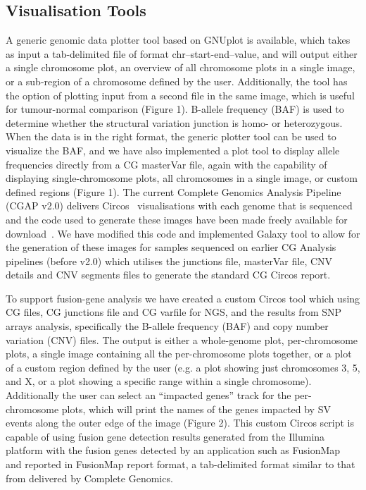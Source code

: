 \documentclass[10pt]{bmc_article}
\newenvironment{bmcformat}{\begin{raggedright}\baselineskip20pt\sloppy\setboolean{publ}{false}}{\end{raggedright}\baselineskip20pt\sloppy}
\begin{document}
\begin{bmcformat}
\subsection*{Visualisation Tools}
A generic genomic data plotter tool based on GNUplot is available, which takes as input a tab-delimited file of format chr–start-end–value, and will output either a single chromosome plot, an overview of all chromosome plots in a single image,  or a sub-region of a chromosome defined by the user. Additionally, the tool has the option of plotting input from a second file in the same image, which is useful for tumour-normal comparison (Figure 1). B-allele frequency (BAF) is used to determine whether the structural variation junction is homo- or heterozygous. When the data is in the right format, the generic plotter tool can be used to visualize the BAF, and we have also implemented a plot tool to display allele frequencies directly from a CG masterVar file, again with the capability of displaying single-chromosome plots, all chromosomes in a single image, or custom defined regions (Figure 1). The current Complete Genomics  Analysis Pipeline (CGAP v2.0) delivers Circos~\cite{url-circos} visualisations with each genome that is sequenced and the code used to generate these images have been made freely available for download~\cite{url-cgcircos}.  We have modified this code and implemented Galaxy tool to allow for the generation of these images for samples sequenced on earlier CG Analysis pipelines (before v2.0) which utilises the junctions file, masterVar file, CNV details and CNV segments files to generate the standard CG Circos report. 

To support fusion-gene analysis we have created a custom Circos tool which using CG files, CG junctions file and CG varfile for NGS, and the results from SNP arrays analysis, specifically the B-allele frequency (BAF) and copy number variation (CNV) files.  The output is either a whole-genome plot, per-chromosome plots, a single image containing all the per-chromosome plots together, or a plot of a custom region defined by the user (e.g. a plot showing just chromosomes 3, 5, and X, or a plot showing a specific range within a single chromosome).  Additionally the user can select an “impacted genes” track for the per-chromosome plots, which will print the names of the genes impacted by SV events along the outer edge of the image (Figure 2).  This custom Circos script is capable of using fusion gene detection results generated from the Illumina platform with the fusion genes detected by an application such as FusionMap~\cite{fusionmap} and reported in FusionMap report format, a tab-delimited format similar to that from delivered by Complete Genomics. 


\end{bmcformat}
\end{document}
